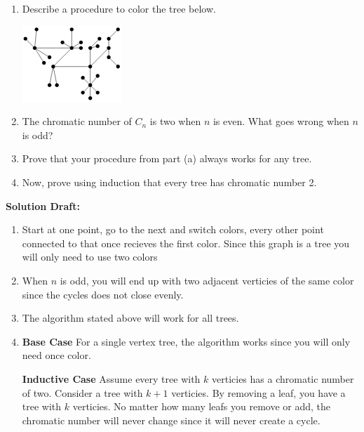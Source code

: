 \documentclass{article}
\begin{document}
\begin{enumerate}[label= (\alph*)]
    \item Describe a procedure to color the tree below.
        \begin{center}
            \includegraphics[width=0.8\linewidth]{Capture-2024-04-16-195919.png} %
        \end{center}
    \item The chromatic number of \(C_n\) is two when \(n\) is even. What goes wrong when \(n\) is odd?
    \item Prove that your procedure from part (a) always works for any tree.
    \item Now, prove using induction that every tree has chromatic number 2.
\end{enumerate}
    

\vspace{0.5cm}
\noindent\textbf{Solution Draft:} 
\vspace{0.2cm}

\begin{enumerate}
    \item Start at one point, go to the next and switch colors, every other point connected to that once recieves the first color. Since this graph is a tree you will only need to use two colors
    \item When $n$ is odd, you will end up with two adjacent verticies of the same color since the cycles does not close evenly.
    \item The algorithm stated above will work for all trees.
    \item 

    \textbf{Base Case}
    For a single vertex tree, the algorithm works since you will only need once color.

    \textbf{Inductive Case}
    Assume every tree with $k$ verticies has a chromatic number of two. Consider a tree with $k+1$ verticies. By removing a leaf, you have a tree with $k$ verticies. No matter how many leafs you remove or add, the chromatic number will never change since it will never create a cycle.
\end{enumerate}
\end{document}
